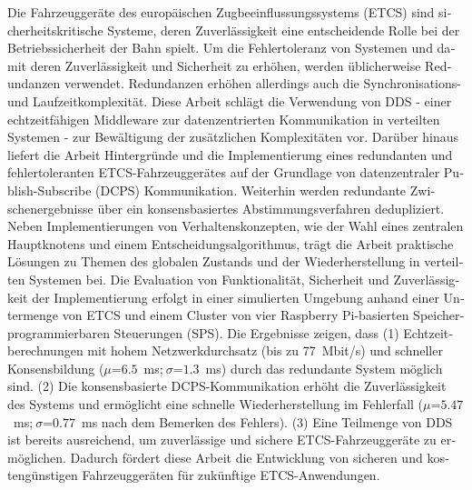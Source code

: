 \null\vfil
\begin{otherlanguage}{ngerman}
\begin{center}\textsf{\textbf{\abstractname}}\end{center}

\noindent 
Die Fahrzeuggeräte des europäischen Zugbeeinflussungssystems (ETCS) sind sicherheitskritische Systeme, deren Zuverlässigkeit eine entscheidende Rolle bei der Betriebssicherheit der Bahn spielt.
Um die Fehlertoleranz von Systemen und damit deren Zuverlässigkeit und Sicherheit zu erhöhen, werden üblicherweise Redundanzen verwendet.
Redundanzen erhöhen allerdings auch die Synchronisations- und Laufzeitkomplexität.
Diese Arbeit schlägt die Verwendung von DDS - einer echtzeitfähigen Middleware zur datenzentrierten Kommunikation in verteilten Systemen - zur Bewältigung der zusätzlichen Komplexitäten vor.
Darüber hinaus liefert die Arbeit Hintergründe und die Implementierung eines redundanten und fehlertoleranten ETCS-Fahrzeuggerätes auf der Grundlage von datenzentraler Publish-Subscribe (DCPS) Kommunikation.
Weiterhin werden redundante Zwischenergebnisse über ein konsensbasiertes Abstimmungsverfahren dedupliziert.
Neben Implementierungen von Verhaltenskonzepten, wie der Wahl eines zentralen Hauptknotens und einem Entscheidungsalgorithmus, trägt die Arbeit praktische Lösungen zu Themen des globalen Zustands und der Wiederherstellung in verteilten Systemen bei.
Die Evaluation von Funktionalität, Sicherheit und Zuverlässigkeit der Implementierung erfolgt in einer simulierten Umgebung anhand einer Untermenge von ETCS und einem Cluster von vier Raspberry Pi-basierten Speicherprogrammierbaren Steuerungen (SPS).
Die Ergebnisse zeigen, dass (1) Echtzeitberechnungen mit hohem Netzwerkdurchsatz (bis zu 77~Mbit/s) und schneller Konsensbildung ($\mu$=$6.5$~ms;$~\sigma$=$1.3$~ms) durch das redundante System möglich sind.
(2) Die konsensbasierte DCPS-Kommunikation erhöht die Zuverlässigkeit des Systems und ermöglicht eine schnelle Wiederherstellung im Fehlerfall ($\mu$=$5.47$~ms;$~\sigma$=$0.77$~ms nach dem Bemerken des Fehlers).
(3) Eine Teilmenge von DDS ist bereits ausreichend, um zuverlässige und sichere ETCS-Fahrzeuggeräte zu ermöglichen.
Dadurch fördert diese Arbeit die Entwicklung von sicheren und kostengünstigen Fahrzeuggeräten für zukünftige ETCS-Anwendungen.

\end{otherlanguage}
\vfil\null


